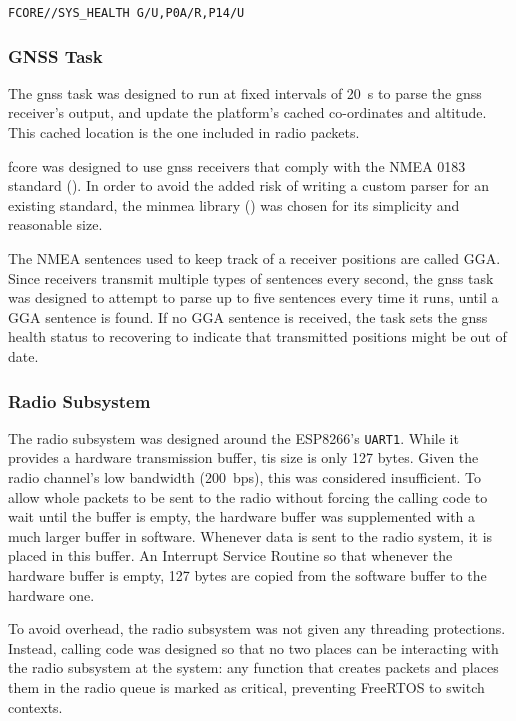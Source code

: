 \begin{lstlisting}[caption=FCORE - Example Health Message, label=lst:health-message]
FCORE//SYS_HEALTH G/U,P0A/R,P14/U
\end{lstlisting}

\subsubsection{GNSS Task}

The \acrshort{gnss} task was designed to run at fixed intervals of
\SI{20}{\second} to parse the \acrshort{gnss} receiver's output, and update the
platform's cached co-ordinates and altitude. This cached location is the one
included in radio packets.

\acrshort{fcore} was designed to use \acrshort{gnss} receivers that comply with
the NMEA 0183 standard (\cite{Bekte2001}). In order to avoid the added risk of
writing a custom parser for an existing standard, the minmea library
(\cite{Moczek2016}) was chosen for its simplicity and reasonable size.

The NMEA sentences used to keep track of a receiver positions are called GGA.
Since receivers transmit multiple types of sentences every second, the
\acrshort{gnss} task was designed to attempt to parse up to five sentences
every time it runs, until a GGA sentence is found. If no GGA sentence is 
received, the task sets the \acrshort{gnss} health status to recovering to
indicate that transmitted positions might be out of date.

\subsubsection{Radio Subsystem}

The radio subsystem was designed around the ESP8266's \texttt{UART1}. While it
provides a hardware transmission buffer, tis size is only 127 bytes. Given the
radio channel's low bandwidth (\SI{200}{bps}), this was considered insufficient.
To allow whole packets to be sent to the radio without forcing the calling code
to wait until the buffer is empty, the hardware buffer was supplemented with
a much larger buffer in software. Whenever data is sent to the radio system,
it is placed in this buffer. An Interrupt Service Routine so that whenever the
hardware buffer is empty, 127 bytes are copied from the software buffer to the
hardware one.

To avoid overhead, the radio subsystem was not given any threading protections.
Instead, calling code was designed so that no two places can be interacting with
the radio subsystem at the system: any function that creates packets and places
them in the radio queue is marked as critical, preventing FreeRTOS to switch
contexts.

